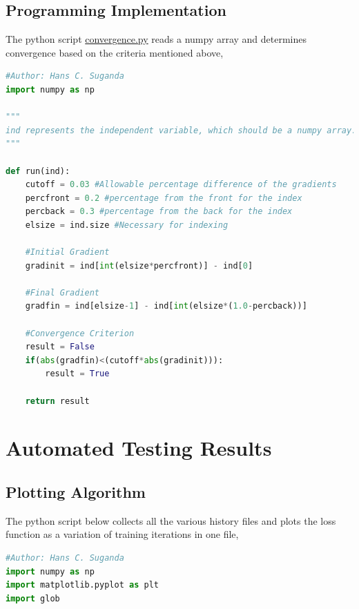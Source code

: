 \documentclass[a4paper, 12pt]{report}
\begin{document}
\begin{center}
\subsection{Programming Implementation}
The python script \url{convergence.py} reads a numpy array and determines convergence based on the criteria mentioned above,
\begin{lstlisting}[language=python]
#Author: Hans C. Suganda
import numpy as np

"""
ind represents the independent variable, which should be a numpy array. To test for convergence, the function below takes average gradient at the earlier stages of the given array. The function does the same but for later stages of the given array, then if the gradient at the later stages of the array is much less than the initial gradient, then the given array is assumed to have indicated "convergence" of the numerical scheme
"""

def run(ind):
    cutoff = 0.03 #Allowable percentage difference of the gradients
    percfront = 0.2 #percentage from the front for the index
    percback = 0.3 #percentage from the back for the index
    elsize = ind.size #Necessary for indexing
    
    #Initial Gradient
    gradinit = ind[int(elsize*percfront)] - ind[0]
    
    #Final Gradient
    gradfin = ind[elsize-1] - ind[int(elsize*(1.0-percback))]

    #Convergence Criterion
    result = False
    if(abs(gradfin)<(cutoff*abs(gradinit))):
        result = True
    
    return result
\end{lstlisting}

\section{Automated Testing Results}

\subsection{Plotting Algorithm}
The python script below collects all the various history files and plots the loss function as a variation of training iterations in one file,
\begin{lstlisting}[language=python]
#Author: Hans C. Suganda
import numpy as np
import matplotlib.pyplot as plt
import glob


\end{lstlisting}
\end{center}
\end{document}
